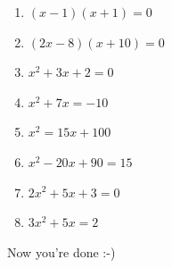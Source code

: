 \documentclass[11pt]{article}
\begin{document}
\begin{enumerate}[resume]

\item $(x-1)(x+1)=0$\\

	\vspace{1cm}
	
\item $(2x-8)(x+10)=0$\\

	\vspace{1cm}

\item $x^2+3x+2=0$\\

	\vspace{1cm}

\item $x^2+7x=-10$\\

	\vspace{1cm}

\item $x^2=15x+100$\\

	\vspace{1cm}

\item $x^2-20x+90=15$\\

	\vspace{1cm}

\item $2x^2+5x+3=0$\\

	\vspace{1cm}

\item $3x^2+5x=2$\\
\end{enumerate}

\vspace{1in}

Now you're done :-)
\end{document}
